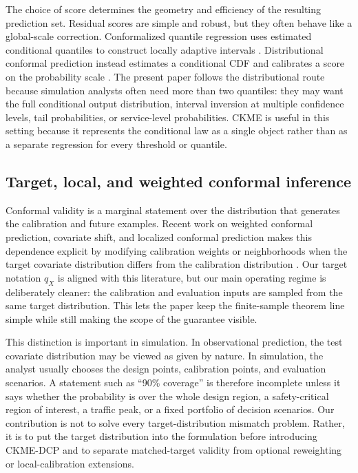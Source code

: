 \documentclass[11pt]{article}
\begin{document}
The choice of score determines the geometry and efficiency of the resulting prediction set. Residual scores are simple and robust, but they often behave like a global-scale correction. Conformalized quantile regression uses estimated conditional quantiles to construct locally adaptive intervals \cite{romano2019}. Distributional conformal prediction instead estimates a conditional CDF and calibrates a score on the probability scale \cite{chernozhukov2021}. The present paper follows the distributional route because simulation analysts often need more than two quantiles: they may want the full conditional output distribution, interval inversion at multiple confidence levels, tail probabilities, or service-level probabilities. CKME is useful in this setting because it represents the conditional law as a single object rather than as a separate regression for every threshold or quantile.

\subsection{Target, local, and weighted conformal inference}

Conformal validity is a marginal statement over the distribution that generates the calibration and future examples. Recent work on weighted conformal prediction, covariate shift, and localized conformal prediction makes this dependence explicit by modifying calibration weights or neighborhoods when the target covariate distribution differs from the calibration distribution \cite{tibshirani2019,hore2025}. Our target notation \(q_X\) is aligned with this literature, but our main operating regime is deliberately cleaner: the calibration and evaluation inputs are sampled from the same target distribution. This lets the paper keep the finite-sample theorem line simple while still making the scope of the guarantee visible.

This distinction is important in simulation. In observational prediction, the test covariate distribution may be viewed as given by nature. In simulation, the analyst usually chooses the design points, calibration points, and evaluation scenarios. A statement such as ``90\% coverage'' is therefore incomplete unless it says whether the probability is over the whole design region, a safety-critical region of interest, a traffic peak, or a fixed portfolio of decision scenarios. Our contribution is not to solve every target-distribution mismatch problem. Rather, it is to put the target distribution into the formulation before introducing CKME-DCP and to separate matched-target validity from optional reweighting or local-calibration extensions.
\end{document}
